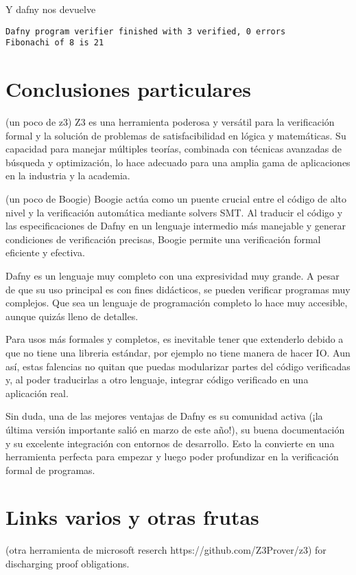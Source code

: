 \documentclass[runningheads]{llncs}
\begin{document}
Y dafny nos devuelve 
\begin{verbatim}
Dafny program verifier finished with 3 verified, 0 errors
Fibonachi of 8 is 21
\end{verbatim}

\section{Conclusiones particulares}

(un poco de z3)
Z3 es una herramienta poderosa y versátil para la verificación formal y la solución de problemas de satisfacibilidad en lógica y matemáticas. 
Su capacidad para manejar múltiples teorías, combinada con técnicas avanzadas de búsqueda y optimización, 
lo hace adecuado para una amplia gama de aplicaciones en la industria y la academia.

(un poco de Boogie)
Boogie actúa como un puente crucial entre el código de alto nivel y la verificación automática mediante solvers SMT. 
Al traducir el código y las especificaciones de Dafny en un lenguaje intermedio más manejable y generar condiciones de verificación precisas, 
Boogie permite una verificación formal eficiente y efectiva.

Dafny es un lenguaje muy completo con una expresividad muy grande. A pesar de que su uso principal es con fines didácticos, se pueden verificar programas muy complejos. Que sea un lenguaje de programación completo lo hace muy accesible, aunque quizás lleno de detalles.

Para usos más formales y completos, es inevitable tener que extenderlo debido a que no tiene una libreria estándar, por ejemplo no tiene manera de hacer IO.
Aun así, estas falencias no quitan que puedas modularizar partes del código verificadas y, al poder traducirlas a otro lenguaje, integrar código verificado en una aplicación real.

Sin duda, una de las mejores ventajas de Dafny es su comunidad activa (¡la última versión importante salió en marzo de este año!), su buena documentación y su excelente integración con entornos de desarrollo. Esto la convierte en una herramienta perfecta para empezar y luego poder profundizar en la verificación formal de programas.
\section{Links varios y otras frutas}
(otra herramienta de microsoft reserch https://github.com/Z3Prover/z3) for discharging proof obligations.
\end{document}
